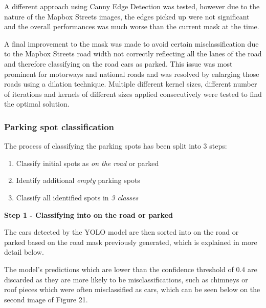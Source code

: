 A different approach using Canny Edge Detection was tested, however due to the
nature of the Mapbox Streets images, the edges picked up were not significant
and the overall performances was much worse than the current mask at the time.

A final improvement to the mask was made to avoid certain misclassification due
to the Mapbox Streets road width not correctly reflecting all the lanes of the
road and therefore classifying on the road cars as parked. This issue was most
prominent for motorways and national roads and was resolved by enlarging those
roads using a dilation technique. Multiple different kernel sizes, different
number of iterations and kernels of different sizes applied consecutively were
tested to find the optimal solution.

\newpage{}

\subsubsection{Parking spot classification}
The process of classifying the parking spots has been split into 3 steps:
\begin{enumerate}
  \item Classify initial spots as \emph{on the road} or {parked}
  \item Identify additional \emph{empty} parking spots
  \item Classify all identified spots in \emph{3 classes}
\end{enumerate}

\textbf{Step 1 - Classifying into on the road or parked}

The cars detected by the YOLO model are then sorted into on the road or parked
based on the road mask previously generated, which is explained in more detail
below.

The model's predictions which are lower than the confidence threshold of 0.4 are
discarded as they are more likely to be misclassifications, such as chimneys or
roof pieces which were often misclassified as cars, which can be seen below on
the second image of Figure 21.

